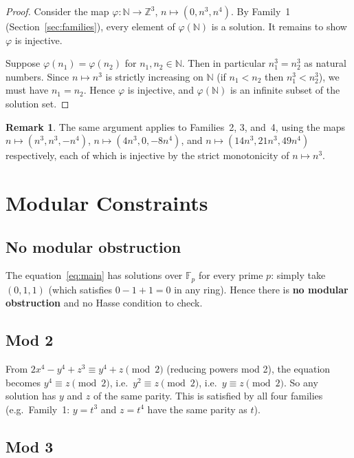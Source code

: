 \documentclass[12pt,a4paper]{article}
\theoremstyle{definition}
\newtheorem{remark}[theorem]{Remark}
\newcommand{\Z}{\mathbb{Z}}
\newcommand{\N}{\mathbb{N}}
\begin{document}
\begin{proof}
  Consider the map $\varphi : \N \to \Z^3$, $n \mapsto (0, n^3, n^4)$.  By
  Family~1 (Section~\ref{sec:families}), every element of $\varphi(\N)$ is a solution.
  It remains to show $\varphi$ is injective.

  Suppose $\varphi(n_1) = \varphi(n_2)$ for $n_1, n_2 \in \N$.  Then in particular
  $n_1^3 = n_2^3$ as natural numbers.  Since $n \mapsto n^3$ is strictly increasing on $\N$
  (if $n_1 < n_2$ then $n_1^3 < n_2^3$), we must have $n_1 = n_2$.  Hence $\varphi$ is
  injective, and $\varphi(\N)$ is an infinite subset of the solution set.
\end{proof}

\begin{remark}
  The same argument applies to Families~2, 3, and~4, using the maps
  $n \mapsto (n^3, n^3, -n^4)$,  $n \mapsto (4n^3, 0, -8n^4)$,
  and $n \mapsto (14n^3, 21n^3, 49n^4)$ respectively, each of which is injective
  by the strict monotonicity of $n \mapsto n^3$.
\end{remark}

\section{Modular Constraints}\label{sec:modular}

\subsection{No modular obstruction}

The equation~\eqref{eq:main} has solutions over $\mathbb{F}_p$ for every prime $p$:
simply take $(0, 1, 1)$ (which satisfies $0 - 1 + 1 = 0$ in any ring).  Hence there
is \textbf{no modular obstruction} and no Hasse condition to check.

\subsection{Mod 2}

From $2x^4 - y^4 + z^3 \equiv y^4 + z \pmod{2}$ (reducing powers mod 2), the equation
becomes $y^4 \equiv z \pmod 2$, i.e.\ $y^2 \equiv z \pmod 2$, i.e.\ $y \equiv z \pmod 2$.
So any solution has $y$ and $z$ of the same parity.  This is satisfied by all four
families (e.g.\ Family~1: $y = t^3$ and $z = t^4$ have the same parity as $t$).

\subsection{Mod 3}
\end{document}
